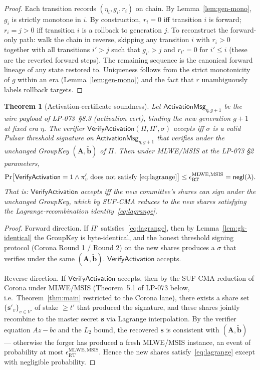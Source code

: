\documentclass[11pt]{article}
\newtheorem{theorem}{Theorem}
\begin{document}
\begin{proof}
Each transition records $(\eta_i, g_i, r_i)$ on chain. By
Lemma~\ref{lem:gen-mono}, $g_i$ is strictly monotone in $i$. By
construction, $r_i = 0$ iff transition $i$ is forward; $r_i = j > 0$
iff transition $i$ is a rollback to generation $j$. To reconstruct the
forward-only path: walk the chain in reverse, skipping any transition
$i$ with $r_i > 0$ together with all transitions $i' > j$ such that
$g_{i'} > j$ and $r_{i'} = 0$ for $i' \leq i$ (these are the reverted
forward steps). The remaining sequence is the canonical forward
lineage of any state restored to. Uniqueness follows from the
strict monotonicity of $g$ within an era (Lemma~\ref{lem:gen-mono})
and the fact that $r$ unambiguously labels rollback targets.
\end{proof}

\begin{theorem}[Activation-certificate soundness]
\label{thm:activation-soundness}
Let $\mathsf{ActivationMsg}_{\eta, g+1}$ be the wire payload of
LP-073~\S8.3 (activation cert), binding the new generation
$g+1$ at fixed era $\eta$. The verifier
$\mathsf{VerifyActivation}(\Pi, \Pi', \sigma)$ accepts iff
$\sigma$ is a valid Pulsar threshold signature on
$\mathsf{ActivationMsg}_{\eta, g+1}$ that verifies under the
\emph{unchanged} GroupKey $(\mathbf{A}, \tilde{\mathbf{b}})$ of $\Pi$.
Then under MLWE/MSIS at the LP-073 \S2 parameters,
\[
  \Pr\bigl[
    \mathsf{VerifyActivation} = 1 \wedge
    \pi'_v \text{ does not satisfy~\eqref{eq:lagrange}}
  \bigr] \leq \epsilon_{\mathrm{RT}}^{\mathrm{MLWE,MSIS}} = \mathsf{negl}(\lambda).
\]
That is: $\mathsf{VerifyActivation}$ accepts iff the new committee's
shares can sign under the unchanged GroupKey, which by SUF-CMA reduces
to the new shares satisfying the Lagrange-recombination
identity~\eqref{eq:lagrange}.
\end{theorem}

\begin{proof}
Forward direction. If $\Pi'$ satisfies~\eqref{eq:lagrange}, then by
Lemma~\ref{lem:gk-identical} the GroupKey is byte-identical, and the
honest threshold signing protocol (Corona Round 1 / Round 2) on the
new shares produces a $\sigma$ that verifies under the same
$(\mathbf{A}, \tilde{\mathbf{b}})$. $\mathsf{VerifyActivation}$
accepts.

Reverse direction. If $\mathsf{VerifyActivation}$ accepts, then by the
SUF-CMA reduction of Corona under MLWE/MSIS (Theorem~5.1 of
LP-073 below, i.e.\ Theorem~\ref{thm:main} restricted to the Corona
lane), there exists a share set $\{\mathbf{s}'_v\}_{v \in V'}$ of stake
$\geq t'$ that produced the signature, and these shares jointly
recombine to the master secret $\mathbf{s}$ via Lagrange interpolation.
By the verifier equation $A z - b c$ and the $L_2$ bound, the recovered
$\mathbf{s}$ is consistent with $(\mathbf{A}, \tilde{\mathbf{b}})$ ---
otherwise the forger has produced a fresh MLWE/MSIS instance, an event
of probability at most $\epsilon_{\mathrm{RT}}^{\mathrm{MLWE,MSIS}}$.
Hence the new shares satisfy~\eqref{eq:lagrange} except with negligible
probability.
\end{proof}
\end{document}
